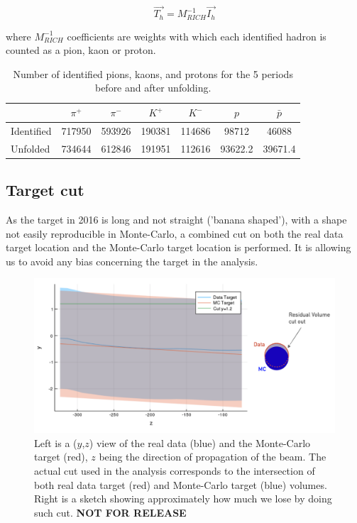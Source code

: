 \documentclass[letterpaper,12pt]{article}
\begin{document}
\begin{equation}
  \overrightarrow{T_h} = M^{-1}_{RICH}\overrightarrow{I_h}
\end{equation}

where $M^{-1}_{RICH}$ coefficients are weights with which each identified hadron is counted as a pion, kaon
or proton.

\begin{table}[]
  \caption{\label{HadNum} Number of identified pions, kaons, and protons for the 5 periods before and after unfolding.}
  \centering
  \begin{tabular}{lcccccc}
    \hline
     & $\pi^+$ & $\pi^-$ & $K^+$ & $K^-$ & $p$ & $\bar{p}$ \\
    \hline
    Identified & 717950 & 593926 & 190381 & 114686 & 98712 & 46088 \\
    Unfolded & 734644 & 612846 & 191951 & 112616 & 93622.2 & 39671.4 \\
    \hline
  \end{tabular}
\end{table}

\subsection{Target cut}

As the target in 2016 is long and not straight ('banana shaped'), with a shape not easily reproducible in Monte-Carlo, a combined cut on both the real data target location and the Monte-Carlo target location is performed. It is allowing us to avoid any bias concerning the target in the analysis.

\begin{figure}[!h]
	\includegraphics[scale=0.4]{./gfx/Target.png}
	\caption{Left is a ($y$,$z$) view of the real data (blue) and the Monte-Carlo target (red), $z$ being the direction of propagation of the beam. The actual cut used in the analysis corresponds to the intersection of both real data target (red) and Monte-Carlo target (blue) volumes. Right is a sketch showing approximately how much we lose by doing such cut. \textbf{NOT FOR RELEASE}}
	\label{Target}
\end{figure}
\end{document}
